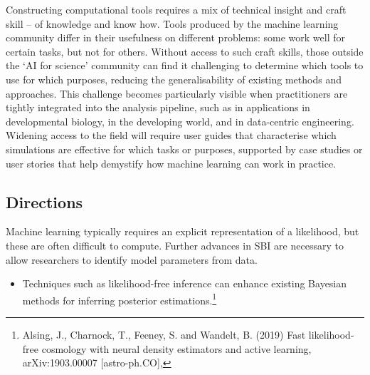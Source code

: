 {Constructing computational tools requires a mix of technical insight and
craft skill -- of knowledge and know how. Tools produced by the machine
learning community differ in their usefulness on different problems:
some work well for certain tasks, but not for others. Without access to
such craft skills, those outside the `AI for science' community can find
it challenging to determine which tools to use for which purposes,
reducing the generalisability of existing methods and approaches. This
challenge becomes particularly visible when practitioners are tightly
integrated into the analysis pipeline, such as in applications in
developmental biology, in the developing world, and in data-centric
engineering. Widening access to the field will require user guides that
characterise which simulations are effective for which tasks or
purposes, supported by case studies or user stories that help demystify
how machine learning can work in practice.

\hypertarget{directions}{%
\subsection{Directions}\label{directions}}

Machine learning typically requires an explicit representation of a
likelihood, but these are often difficult to compute. Further advances
in SBI are necessary to allow researchers to identify model parameters
from data.

\begin{itemize}
\item
  Techniques such as likelihood-free inference can enhance existing
  Bayesian methods for inferring posterior estimations.\footnote{Alsing,
    J., Charnock, T., Feeney, S. and Wandelt, B. (2019) Fast
    likelihood-free cosmology with neural density estimators and active
    learning, arXiv:1903.00007 {[}astro-ph.CO{]},

}
\end{itemize}}
